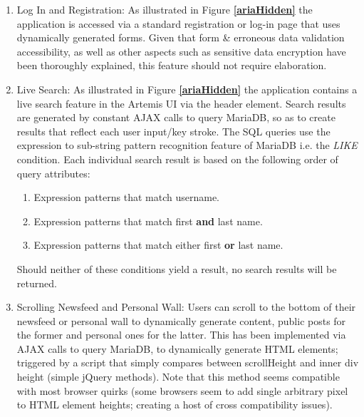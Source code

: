 \begin{enumerate}

    \item Log In and Registration: As illustrated in Figure \textbf{\ref{ariaHidden}} the application is accessed via a standard registration or log-in page that uses dynamically generated forms. Given that form \& erroneous data validation accessibility, as well as other aspects such as sensitive data encryption have been thoroughly explained, this feature should not require elaboration.
    
    \item Live Search: As illustrated in Figure \textbf{ \ref{ariaHidden}} the application contains a live search feature in the Artemis UI via the header element. Search results are generated by constant AJAX calls to query  MariaDB, so as to create results that reflect each user input/key stroke. The SQL queries use the expression to sub-string pattern recognition  feature of MariaDB i.e. the \textit{LIKE} condition. Each individual search result is  based on the following order of query attributes:
        \begin{enumerate}
            \item Expression patterns that match username.
            \item Expression patterns that match first \textbf{and} last name.
            \item Expression patterns that match either first \textbf{or} last name.
        \end{enumerate}
        
    Should neither of these conditions yield a result, no search results will be returned.
    

    \item Scrolling Newsfeed and Personal Wall: Users can scroll to the bottom of their newsfeed or personal wall to dynamically generate content, public posts for the former and personal ones for the latter. This has been implemented via AJAX calls to query MariaDB, to dynamically generate HTML elements; triggered by a script that simply compares between scrollHeight and inner div height (simple jQuery methods). Note that this method seems compatible with most browser quirks (some browsers seem to add single arbitrary pixel to HTML element heights; creating a host of cross compatibility issues).
    

\end{enumerate}
